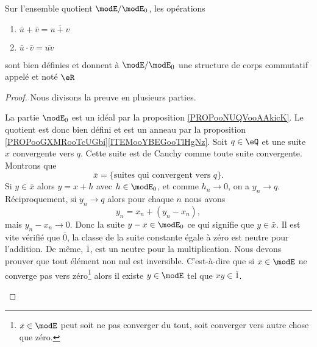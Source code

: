 \begin{theoremDef}       \label{DefooFKYKooOngSCB}
	Sur l'ensemble quotient \( \modE/\modE_0\), les opérations
	\begin{enumerate}
		\item
		      \( \bar u+\bar v=\overline{ u+v }\)
		\item
		      \( \bar u\cdot \bar v=\overline{ uv }\)
	\end{enumerate}
	sont bien définies et donnent à \( \modE/\modE_0\) une structure de corps commutatif appelé  et noté \( \eR\)
\end{theoremDef}

\begin{proof}
	Nous divisons la preuve en plusieurs parties.
	\begin{subproof}
		La partie \( \modE_0\) est un idéal par la proposition \ref{PROPooNUQVooAAkicK}. Le quotient est donc bien défini et est un anneau par la proposition \ref{PROPooGXMRooTcUGbi}\ref{ITEMooYBEGooTlHgNz}.
		Soit \( q\in \eQ\) et une suite \( x\) convergente vers \( q\). Cette suite est de Cauchy comme toute suite convergente. Montrons que
		\begin{equation}
			\bar x=\{ \text{suites qui convergent vers } q \}.
		\end{equation}
		Si \( y\in\bar x\) alors \( y=x+h\) avec \( h\in \modE_0\), et comme \( h_n\to 0\), on a \( y_n\to q\). Réciproquement, si \( y_n\to q\) alors pour chaque \( n\) nous avons
		\begin{equation}
			y_n=x_n+(y_n-x_n),
		\end{equation}
		mais \( y_n-x_n\to 0\). Donc la suite \( y-x\in\modE_0\) ce qui signifie que \( y\in\bar x\).
		Il est vite vérifié que \( \bar 0\), la classe de la suite constante égale à zéro est neutre pour l'addition. De même, \( \bar 1\), est un neutre pour la multiplication.
		\spitem[Corps]
		Nous devons prouver que tout élément non nul est inversible. C'est-à-dire que si \( x\in\modE\) ne converge pas vers zéro\footnote{\( x\in\modE\) peut soit ne pas converger du tout, soit converger vers autre chose que zéro.} alors il existe \( y\in \modE\) tel que \( xy\in\bar 1\).


\end{subproof}
\end{proof}
